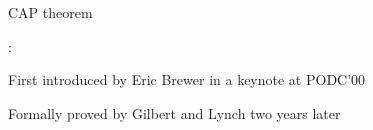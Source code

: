 \begin{frame}{CAP theorem}

:

\BIL
\item First introduced by Eric Brewer in a keynote at PODC'00
\BI
\item {\footnotesize {}}
\EI
\item Formally proved by Gilbert and Lynch two years later
\BI
\item {\footnotesize {}}
\EI
\EIL
\end{frame}


\begin{RMFrame}

\BI
\item {}
\item {}
\EI

\end{RMFrame}

